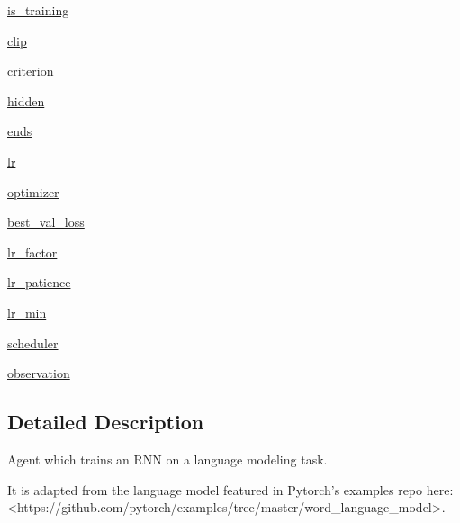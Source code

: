 \begin{DoxyCompactItemize}
\item 
\hyperlink{classparlai_1_1agents_1_1language__model_1_1language__model_1_1LanguageModelAgent_ae4a04c916f52bdd6d5163d36d49aa378}{is\+\_\+training}
\item 
\hyperlink{classparlai_1_1agents_1_1language__model_1_1language__model_1_1LanguageModelAgent_a0cedb5672a7f4f6533490fbf550cb853}{clip}
\item 
\hyperlink{classparlai_1_1agents_1_1language__model_1_1language__model_1_1LanguageModelAgent_a5a7f43878aa096fd1f091dd403dfe30c}{criterion}
\item 
\hyperlink{classparlai_1_1agents_1_1language__model_1_1language__model_1_1LanguageModelAgent_aa7c4053a69871ded8ac7f6afc31b9af3}{hidden}
\item 
\hyperlink{classparlai_1_1agents_1_1language__model_1_1language__model_1_1LanguageModelAgent_ab0db3334e63765ac0e7fd991db214f72}{ends}
\item 
\hyperlink{classparlai_1_1agents_1_1language__model_1_1language__model_1_1LanguageModelAgent_a8be32c6f1a5b35f4c508c9dc1ca911b8}{lr}
\item 
\hyperlink{classparlai_1_1agents_1_1language__model_1_1language__model_1_1LanguageModelAgent_a222e071975fc874e82e6480c030bbb9d}{optimizer}
\item 
\hyperlink{classparlai_1_1agents_1_1language__model_1_1language__model_1_1LanguageModelAgent_a981e3901460fa1eda1d8564a1792eef3}{best\+\_\+val\+\_\+loss}
\item 
\hyperlink{classparlai_1_1agents_1_1language__model_1_1language__model_1_1LanguageModelAgent_ac57a5e5b664eca0b561973b98a6f5ab5}{lr\+\_\+factor}
\item 
\hyperlink{classparlai_1_1agents_1_1language__model_1_1language__model_1_1LanguageModelAgent_a89bb8ba94b9f71ea1571b2b9b38f180a}{lr\+\_\+patience}
\item 
\hyperlink{classparlai_1_1agents_1_1language__model_1_1language__model_1_1LanguageModelAgent_a045ef7c347b9295879ff3aaec1a8d9a0}{lr\+\_\+min}
\item 
\hyperlink{classparlai_1_1agents_1_1language__model_1_1language__model_1_1LanguageModelAgent_a4695c070d27825b7ee206eac0fb4b576}{scheduler}
\item 
\hyperlink{classparlai_1_1agents_1_1language__model_1_1language__model_1_1LanguageModelAgent_aee73b46f6a1dd58cf369bf39b6c66903}{observation}
\end{DoxyCompactItemize}


\subsection{Detailed Description}
\begin{DoxyVerb}Agent which trains an RNN on a language modeling task.

It is adapted from the language model featured in Pytorch's examples repo
here: <https://github.com/pytorch/examples/tree/master/word_language_model>.
\end{DoxyVerb}
 

